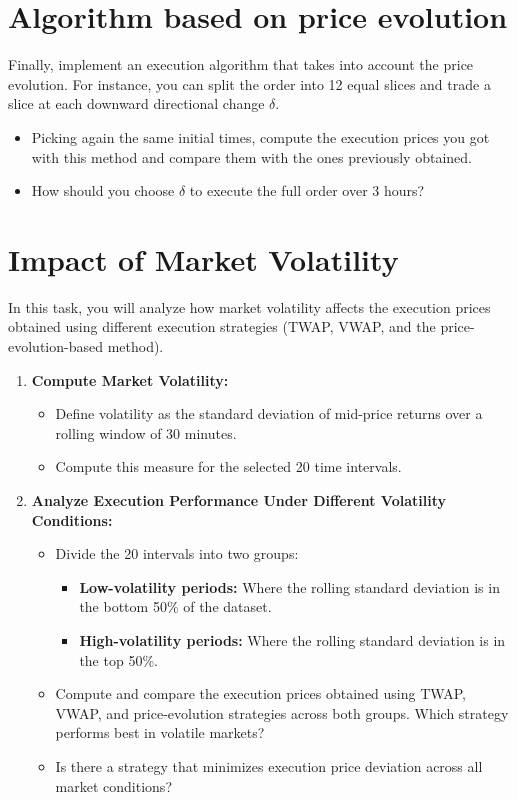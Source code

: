 \section{Algorithm based on price evolution}
Finally, implement an execution algorithm that takes into account the price evolution. For instance, you can split the order into 12 equal slices and trade a slice at each downward directional change $\delta$. 
\begin{itemize}
    \item Picking again the same initial times, compute the execution prices you got with this method and compare them with the ones previously obtained. 
    \item How should you choose $\delta$ to execute the full order over 3 hours?
\end{itemize}

\section{Impact of Market Volatility}
In this task, you will analyze how market volatility affects the execution prices obtained using different execution strategies (TWAP, VWAP, and the price-evolution-based method). 
\begin{enumerate}
    \item \textbf{Compute Market Volatility:} 
    \begin{itemize}
        \item Define volatility as the standard deviation of mid-price returns over a rolling window of 30 minutes.
        \item Compute this measure for the selected 20 time intervals.
    \end{itemize}
    \item \textbf{Analyze Execution Performance Under Different Volatility Conditions:}
    \begin{itemize}
        \item Divide the 20 intervals into two groups:
        \begin{itemize}
            \item \textbf{Low-volatility periods:} Where the rolling standard deviation is in the bottom 50\% of the dataset.
            \item \textbf{High-volatility periods:} Where the rolling standard deviation is in the top 50\%.
        \end{itemize}
        \item Compute and compare the execution prices obtained using TWAP, VWAP, and price-evolution strategies across both groups. Which strategy performs best in volatile markets?
        \item Is there a strategy that minimizes execution price deviation across all market conditions?
    \end{itemize}
\end{enumerate}